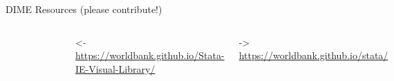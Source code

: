 \documentclass[aspectratio=169]{beamer}
\begin{document}
\begin{frame}[fragile]{DIME Resources (please contribute!)}
	\begin{columns}[c]
		\begin{figure}
			\centering
			\includegraphics[width=\linewidth]{img/visualie}
		\end{figure}


		\small <- \newline \url{https://worldbank.github.io/Stata-IE-Visual-Library/}

		\vspace{.8cm}

		\small -> \newline \url{https://worldbank.github.io/stata/}


\end{columns}
\end{frame}
\end{document}
